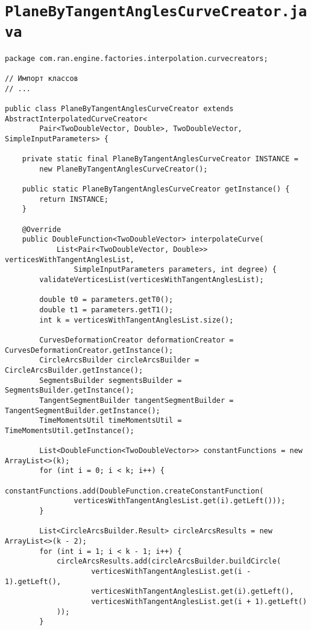 \section*{\texttt{PlaneByTangentAnglesCurveCreator.java}}
\begin{verbatim}
package com.ran.engine.factories.interpolation.curvecreators;

// Импорт классов
// ...

public class PlaneByTangentAnglesCurveCreator extends AbstractInterpolatedCurveCreator<
        Pair<TwoDoubleVector, Double>, TwoDoubleVector, SimpleInputParameters> {

    private static final PlaneByTangentAnglesCurveCreator INSTANCE =
        new PlaneByTangentAnglesCurveCreator();

    public static PlaneByTangentAnglesCurveCreator getInstance() {
        return INSTANCE;
    }

    @Override
    public DoubleFunction<TwoDoubleVector> interpolateCurve(
            List<Pair<TwoDoubleVector, Double>> verticesWithTangentAnglesList,
                SimpleInputParameters parameters, int degree) {
        validateVerticesList(verticesWithTangentAnglesList);

        double t0 = parameters.getT0();
        double t1 = parameters.getT1();
        int k = verticesWithTangentAnglesList.size();

        CurvesDeformationCreator deformationCreator = CurvesDeformationCreator.getInstance();
        CircleArcsBuilder circleArcsBuilder = CircleArcsBuilder.getInstance();
        SegmentsBuilder segmentsBuilder = SegmentsBuilder.getInstance();
        TangentSegmentBuilder tangentSegmentBuilder = TangentSegmentBuilder.getInstance();
        TimeMomentsUtil timeMomentsUtil = TimeMomentsUtil.getInstance();

        List<DoubleFunction<TwoDoubleVector>> constantFunctions = new ArrayList<>(k);
        for (int i = 0; i < k; i++) {
            constantFunctions.add(DoubleFunction.createConstantFunction(
                verticesWithTangentAnglesList.get(i).getLeft()));
        }

        List<CircleArcsBuilder.Result> circleArcsResults = new ArrayList<>(k - 2);
        for (int i = 1; i < k - 1; i++) {
            circleArcsResults.add(circleArcsBuilder.buildCircle(
                    verticesWithTangentAnglesList.get(i - 1).getLeft(),
                    verticesWithTangentAnglesList.get(i).getLeft(),
                    verticesWithTangentAnglesList.get(i + 1).getLeft()
            ));
        }


\end{verbatim}
